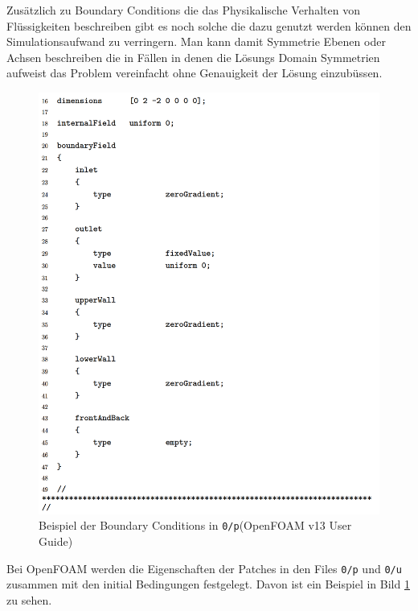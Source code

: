 Zusätzlich zu Boundary Conditions die das Physikalische Verhalten von Flüssigkeiten beschreiben gibt es noch solche die dazu genutzt werden können den Simulationsaufwand zu verringern.
Man kann damit Symmetrie Ebenen oder Achsen beschreiben die in Fällen in denen die Lösungs Domain Symmetrien aufweist das Problem vereinfacht ohne Genauigkeit der Lösung einzubüssen.

\begin{figure}[h]
	\centering
	\includegraphics[scale=0.14]{papers/openfoam/Bilder/beispiel_boundarycond.png }
	\caption{Beispiel der Boundary Conditions in \texttt{0/p}(OpenFOAM v13 User Guide)}
	\label{openfoam:fig:boundarycond}
\end{figure}

Bei OpenFOAM werden die Eigenschaften der Patches in den Files \texttt{0/p} und \texttt{0/u} zusammen mit den initial Bedingungen festgelegt. Davon ist ein Beispiel in Bild \ref{openfoam:fig:boundarycond} zu sehen.

